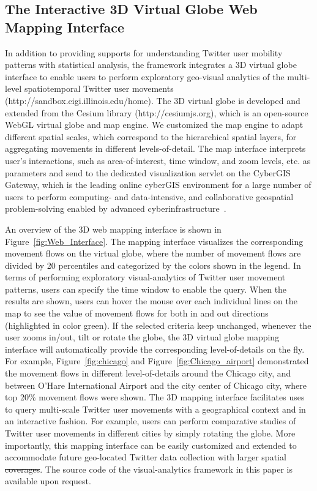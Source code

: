 \documentclass[ijgi,article,accept,moreauthors,pdftex,10pt,a4paper]{mdpi}
\theoremstyle{mdpi}
\newcounter{ex}
\newcounter{re}
\theoremstyle{mdpidefinition}
\providecommand{\DIFadd}[1]{{\protect\color{blue}\uwave{#1}}} %
\providecommand{\DIFdel}[1]{{\protect\color{red}\sout{#1}}}                      %
\providecommand{\DIFaddbegin}{} %
\providecommand{\DIFaddend}{} %
\providecommand{\DIFdelbegin}{} %
\providecommand{\DIFdelend}{} %
\begin{document}
\subsection{The Interactive 3D Virtual Globe Web Mapping Interface}
In addition to providing supports for understanding Twitter user mobility patterns with statistical analysis, the framework integrates a 3D virtual globe interface to enable users to perform exploratory geo-visual analytics of the multi-level spatiotemporal Twitter user movements (http://sandbox.cigi.illinois.edu/home). 
The 3D virtual globe is developed and extended from the Cesium library (http://cesiumjs.org), which is an open-source WebGL virtual globe and map engine.
We customized the map engine to adapt different spatial scales, which correspond to the hierarchical spatial layers, for aggregating movements in different levels-of-detail.
The map interface interprets user's interactions, such as area-of-interest, time window, and zoom levels, etc. as parameters and send to the dedicated visualization servlet on the CyberGIS Gateway, which is the leading online cyberGIS environment for a large number of users to perform computing- and data-intensive, and collaborative geospatial problem-solving enabled by advanced cyberinfrastructure~\cite{liu2014cybergis}.

An overview of the 3D web mapping interface is shown in Figure~\ref{fig:Web_Interface}.
The mapping interface visualizes the corresponding movement flows on the virtual globe, where the number of movement flows are divided by 20 percentiles and categorized by the colors shown in the legend.
In terms of performing exploratory visual-analytics of Twitter user movement patterns, users can specify the time window to enable the query. 
When the results are shown, users can hover the mouse over each individual lines on the map to see the value of movement flows for both in and out directions (highlighted in color green).
If the selected criteria keep unchanged, whenever the user zooms in/out, tilt or rotate the globe, the 3D virtual globe mapping interface will automatically provide the corresponding level-of-details on the fly.
For example, Figure~\ref{fig:chicago} and Figure~\ref{fig:Chicago_airport} demonstrated the movement flows in different level-of-details around the Chicago city, and between O'Hare International Airport and the city center of Chicago city, where top 20$\%$ movement flows were shown.
The 3D mapping interface facilitates uses to query multi-scale Twitter user movements with a geographical context and in an interactive fashion.
For example, users can perform comparative studies of Twitter user movements in different cities by simply rotating the globe. 
More importantly, this mapping interface can be easily customized and extended to accommodate future geo-located Twitter data collection with larger spatial \DIFdelbegin \DIFdel{coverages}\DIFdelend \DIFaddbegin \DIFadd{coverage}\DIFaddend .
The source code of the visual-analytics framework in this paper is available upon request.
\end{document}

